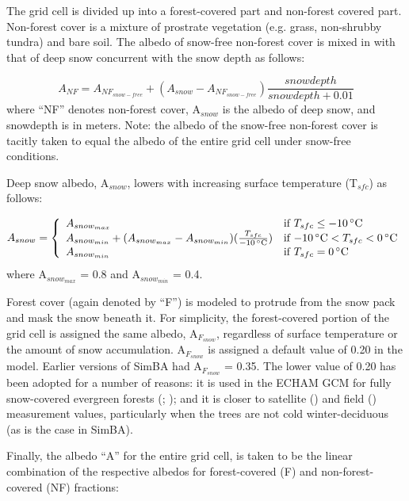 The grid cell is divided up into a forest-covered part and non-forest covered part.  Non-forest cover is a mixture of prostrate vegetation (e.g. grass, non-shrubby tundra) and bare soil.  The albedo of snow-free non-forest cover is mixed in with that of deep snow concurrent with the snow depth as follows:

\begin{equation}
A_{NF} = A_{NF_{snow-free}} + (A_{snow} - A_{NF_{snow-free}}) \frac{snowdepth}{snowdepth + 0.01}
\end{equation}
where ``NF'' denotes non-forest cover, A$_{snow}$ is the albedo of deep snow, and snowdepth is in meters.  Note:  the albedo of the snow-free non-forest cover is tacitly taken to equal the albedo of the entire grid cell under snow-free conditions. 

Deep snow albedo, A$_{snow}$, lowers with increasing surface temperature (T$_{sfc }$) as follows:

\begin{equation}
A_{snow} = \left\{ \begin{array}{ll} 
  A_{snow_{max}} & \mbox{if $T_{sfc} \leq -10\,^{\circ}\mathrm{C}$} \\
  A_{snow_{min}} + (A_{snow_{max}} - A_{snow_{min}}) (\frac{T_{sfc }}{-10\,^{\circ}\mathrm{C}}) & \mbox{if $ -10\,^{\circ}\mathrm{C} < T_{sfc }< 0\,^{\circ}\mathrm{C}$} \\
  A_{snow_{min}} & \mbox{if $T_{sfc} = 0\,^{\circ}\mathrm{C}$}
\end{array} \right.
\end{equation}
where A$_{snow_{max}}$ = 0.8 and A$_{snow_{min}}$ = 0.4.

Forest cover (again denoted by ``F'') is modeled to protrude from the snow pack and mask the snow beneath it.  For simplicity, the forest-covered portion of the grid cell is assigned the same albedo, A$_{F_{snow}}$, regardless of surface temperature or the amount of snow accumulation.  A$_{F_{snow}}$ is assigned a default value of 0.20 in the model.  Earlier versions of SimBA had A$_{F_{snow}}$ = 0.35.  The lower value of 0.20 has been adopted for a number of reasons:  it is used in the ECHAM GCM for fully snow-covered evergreen forests (\cite{roesch2001}; \cite{roesch2006}); and it is closer to satellite (\cite{gao2005}) and field (\cite{betts1997}) measurement values, particularly when the trees are not cold winter-deciduous (as is the case in SimBA).

Finally, the albedo ``A'' for the entire grid cell, is taken to be the linear combination of the respective albedos for forest-covered (F) and non-forest-covered (NF) fractions:

